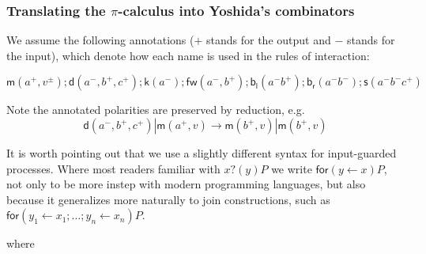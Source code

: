 \documentclass{llncs}
\newcommand{\pic}{$\pi$-calculus}
\newcommand{\ldb}{[\![}
\newcommand{\rdb}{]\!]}
\newcommand{\binpar}[2]{#1 | #2}
\newcommand{\meaningof}[1]{\ldb #1 \rdb}
\begin{document}
\subsubsection{Translating the {\pic} into Yoshida's combinators}
We assume the following annotations ($+$ stands for the output and $-$
stands for the input), which denote how each name is used in the rules
of interaction:

\[\mathsf{m}(a^{+},v^{\pm});\mathsf{d}(a^{-},b^{+},c^{+});\mathsf{k}(a^{-});\mathsf{fw}(a^{-},b^{+});\mathsf{b}_{\mathsf{l}}(a^{-}b^{+});\mathsf{b}_{\mathsf{r}}(a^{-}b^{-});\mathsf{s}(a^{-}b^{-}c^{+})\]

Note the annotated polarities are preserved by reduction, e.g.
\[\binpar{\mathsf{d}(a^{-},b^{+},c^{+})}{\mathsf{m}(a^{+},v)} \to \binpar{\mathsf{m}(b^{+},v)}{\mathsf{m}(b^{+},v)}\]

It is worth pointing out that we use a slightly different syntax for input-guarded processes. Where most readers familiar with $x?(y)P$ we write $\mathsf{for}(y \leftarrow x)P$, not only to be more instep with modern programming languages, but also because it generalizes more naturally to join constructions, such as $\mathsf{for}(y_1 \leftarrow x_1; \ldots; y_n \leftarrow x_n)P$.


where
\end{document}
